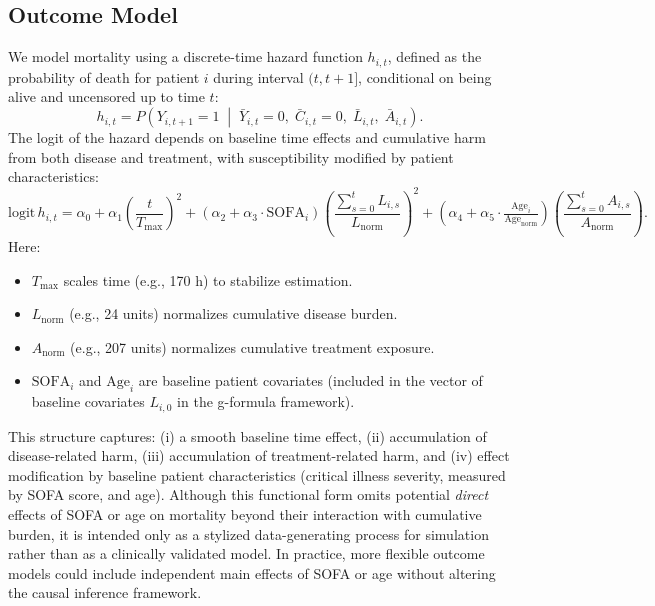 \subsection{Outcome Model}
\label{sec:outcome-model}
\label{subsec:death_model}
We model mortality using a discrete-time hazard function $h_{i,t}$, defined as the probability of death for patient $i$ during interval $(t,t+1]$, conditional on being alive and uncensored up to time $t$:
\[
h_{i,t}
= P\!\left(
Y_{i,t+1} = 1
\;\middle|\;
\bar{Y}_{i,t} = 0,\;
\bar{C}_{i,t} = 0,\;
\bar{L}_{i,t},\;
\bar{A}_{i,t}
\right).
\]
The logit of the hazard depends on baseline time effects and cumulative harm from both disease and treatment, with susceptibility modified by patient characteristics:
\begin{equation}
\text{logit}\,h_{i,t} 
= \alpha_0 
+ \alpha_1 \left( \frac{t}{T_{\max}} \right)^2
+ (\alpha_2 + \alpha_3 \cdot \mathrm{SOFA}_i) \left( \frac{\sum_{s=0}^t L_{i,s}}{L_{\mathrm{norm}}} \right)^2
+ (\alpha_4 + \alpha_5 \cdot \tfrac{\mathrm{Age}_i}{\mathrm{Age}_{\mathrm{norm}}}) \left( \frac{\sum_{s=0}^t A_{i,s}}{A_{\mathrm{norm}}} \right).
\label{eq:death_model}
\end{equation}
Here:
\begin{itemize}
    \item \(T_{\max}\) scales time (e.g., 170 h) to stabilize estimation.
    \item \(L_{\mathrm{norm}}\) (e.g., 24 units) normalizes cumulative disease burden.
    \item \(A_{\mathrm{norm}}\) (e.g., 207 units) normalizes cumulative treatment exposure.
    \item \(\mathrm{SOFA}_i\) and \(\mathrm{Age}_i\) are baseline patient covariates (included in the vector of baseline covariates \(L_{i,0}\) in the g-formula framework).
\end{itemize}
This structure captures: (i) a smooth baseline time effect, (ii) accumulation of disease-related harm, 
(iii) accumulation of treatment-related harm, and (iv) effect modification by baseline patient characteristics 
(critical illness severity, measured by SOFA score, and age). 
Although this functional form omits potential \textit{direct} effects of SOFA or age on mortality beyond their interaction 
with cumulative burden, it is intended only as a stylized data-generating process for simulation rather than as 
a clinically validated model. In practice, more flexible outcome models could include independent main effects of 
SOFA or age without altering the causal inference framework.

